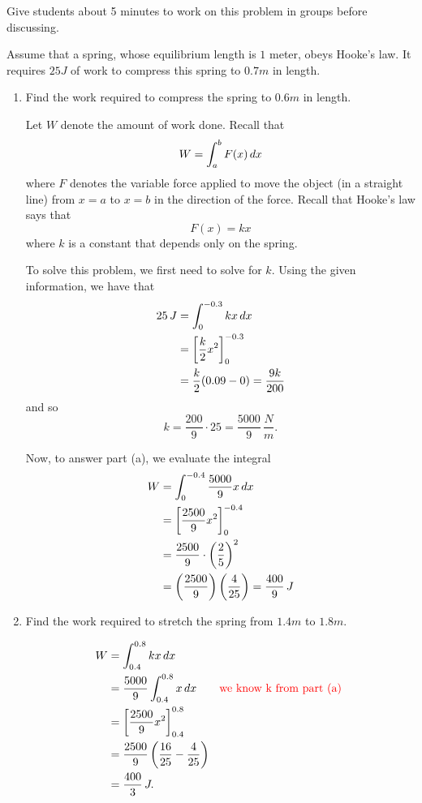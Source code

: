 \documentclass[noinstructornotes]{ximera}
\begin{document}
\begin{instructorNotes}
Give students about 5 minutes to work on this problem in groups before discussing.
\end{instructorNotes}







\begin{problem}
Assume that a spring, whose equilibrium length is $1$ meter, obeys Hooke's law.
It requires $25J$ of work to compress this spring to $0.7m$ in length.  
	\begin{enumerate}
		\item  Find the work required to compress the spring to $0.6m$ in length.  
		\begin{freeResponse}
		Let $W$ denote the amount of work done.  
		Recall that
			\[
			W = \int_a^b F(x) \,d x
			\]
		where $F$ denotes the variable force applied to move the object (in a straight line) from $x=a$ to $x=b$ in the direction of the force.  
		Recall that Hooke's law says that
			\[
			F(x) = k x
			\]
		where $k$ is a constant that depends only on the spring.  
		
		To solve this problem, we first need to solve for $k$.  
		Using the given information, we have that
			\begin{align*}
			25 \, J &= \int_0^{-0.3} kx \,d x  \\
			&= \bigg[ \frac{k}{2} x^2 \bigg]_0^{-0.3}  \\
			&= \frac{k}{2} (0.09 - 0) = \frac{9k}{200}
			\end{align*}
		and so
			\[
			k = \frac{200}{9} \cdot 25 = \frac{5000}{9} \, \frac{N}{m}.
			\]
			
		Now, to answer part (a), we evaluate the integral
			\begin{align*}
			W &= \int_0^{-0.4} \frac{5000}{9} x \,d x  \\
			&= \bigg[ \frac{2500}{9} x^2 \bigg]_0^{-0.4}  \\
			&= \frac{2500}{9} \cdot \left( \frac{2}{5} \right)^2   \\
			&= \left( \frac{2500}{9} \right) \left( \frac{4}{25} \right) = \frac{400}{9} \, J
			\end{align*}
		\end{freeResponse}
		
		
		
		\item  Find the work required to stretch the spring from $1.4m$ to $1.8m$.
		\begin{freeResponse}
			\begin{align*}
			W &= \int_{0.4}^{0.8} k x \,d x  \\
			&= \frac{5000}{9} \int_{0.4}^{0.8} x \,d x \qquad \text{{\color{red} we know k from part (a) }}\\
			&= \bigg[ \frac{2500}{9} x^2 \bigg]_{0.4}^{0.8}  \\
			&= \frac{2500}{9} \left( \frac{16}{25} - \frac{4}{25} \right)  \\
			&= \frac{400}{3} \, J.
			\end{align*}
		\end{freeResponse}
		

\end{enumerate}
\end{problem}
\end{document}
